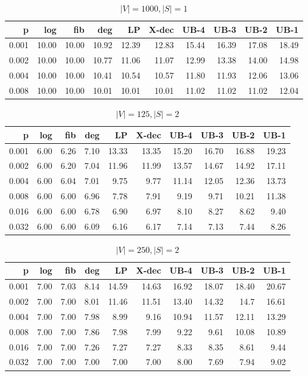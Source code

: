 \begin{table}[]
\centering
\begin{tabular}{rrrrrrrrrr}
p     & log  & fib  & deg  & LP    & X-dec & UB-4  & UB-3  & UB-2  & UB-1  \\
\hline
0.001 & 10.00 & 10.00 & 10.92 & 12.39 & 12.83 & 15.44 & 16.39 & 17.08 & 18.49 \\
0.002 & 10.00 & 10.00 & 10.77 & 11.06 & 11.07 & 12.99 & 13.38 & 14.00 & 14.98 \\
0.004 & 10.00 & 10.00 & 10.41 & 10.54 & 10.57 & 11.80 & 11.93 & 12.06 & 13.06 \\
0.008 & 10.00 & 10.00 & 10.01 & 10.01 & 10.01 & 11.02 & 11.02 & 11.02 & 12.04
\end{tabular}
\caption{$|V|=1000, |S|=1$}
\label{tab:lbup1000}
\end{table}

\begin{table}[]
\centering
\begin{tabular}{rrrrrrrrrr}
p     & log  & fib  & deg  & LP    & X-dec & UB-4  & UB-3  & UB-2  & UB-1  \\
\hline
0.001 & 6.00 & 6.26 & 7.10 & 13.33 & 13.35 & 15.20 & 16.70 & 16.88 & 19.23 \\
0.002 & 6.00 & 6.20 & 7.04 & 11.96 & 11.99 & 13.57 & 14.67 & 14.92 & 17.11 \\
0.004 & 6.00 & 6.04 & 7.01 & 9.75  & 9.77  & 11.14 & 12.05 & 12.36 & 13.73 \\
0.008 & 6.00 & 6.00 & 6.96 & 7.78  & 7.91  & 9.19  & 9.71  & 10.21 & 11.38 \\
0.016 & 6.00 & 6.00 & 6.78 & 6.90  & 6.97  & 8.10  & 8.27  & 8.62  & 9.40  \\
0.032 & 6.00 & 6.00 & 6.09 & 6.16  & 6.17  & 7.14  & 7.13  & 7.44  & 8.26 
\end{tabular}
\caption{$|V|=125, |S|=2$}
\label{tab:lbup1000}
\end{table}

\begin{table}[]
\centering
\begin{tabular}{rrrrrrrrrr}
p     & log  & fib  & deg  & LP    & X-dec & UB-4  & UB-3  & UB-2  & UB-1  \\
\hline
0.001 & 7.00 & 7.03 & 8.14 & 14.59 & 14.63 & 16.92 & 18.07 & 18.40 & 20.67 \\
0.002 & 7.00 & 7.00 & 8.01 & 11.46 & 11.51 & 13.40 & 14.32 & 14.7  & 16.61 \\
0.004 & 7.00 & 7.00 & 7.98 & 8.99  & 9.16  & 10.94 & 11.57 & 12.11 & 13.29 \\
0.008 & 7.00 & 7.00 & 7.86 & 7.98  & 7.99  & 9.22  & 9.61  & 10.08 & 10.89 \\
0.016 & 7.00 & 7.00 & 7.26 & 7.27  & 7.27  & 8.33  & 8.35  & 8.61  & 9.44  \\
0.032 & 7.00 & 7.00 & 7.00 & 7.00  & 7.00  & 8.00  & 7.69  & 7.94  & 9.02 
\end{tabular}
\caption{$|V|=250, |S|=2$}
\label{tab:lbup1000}
\end{table}


